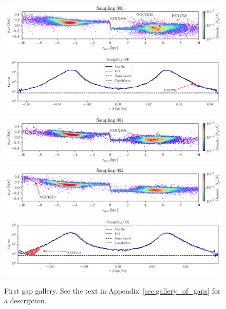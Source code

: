 \documentclass{aa}
\begin{document}
\begin{appendix}
    \begin{figure}
      \centering
      \includegraphics[width=\linewidth]{gallery_of_gaps_monte-carlo-000.png}
      \includegraphics[width=\linewidth]{tau-profile-monte-carlo-000.png}
      \includegraphics[width=\linewidth]{gallery_of_gaps_monte-carlo-001.png}
      \includegraphics[width=\linewidth]{gallery_of_gaps_monte-carlo-002.png}
      \includegraphics[width=\linewidth]{tau-profile-monte-carlo-002.png}
      \caption{First gap gallery. See the text in Appendix~\ref{sec:gallery_of_gaps} for a description.}
      \label{fig:gallery0}
      \end{figure}    



\end{appendix}
\end{document}
